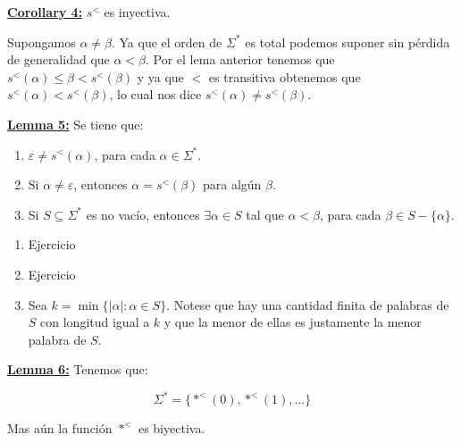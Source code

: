   \QED


  \textbf{\underline{Corollary 4:}} $s^{<}$ es inyectiva.

  \vspace{3mm}
  \PROOF Supongamos $\alpha \neq \beta$. Ya que el orden de $\Sigma^{\ast}$ es total podemos
    suponer sin pérdida de generalidad que $\alpha < \beta$. Por el lema anterior tenemos que $s^{<}(\alpha) \leq \beta
    < s^{<}(\beta)$ y ya que $<$ es transitiva obtenemos que $s^{<}(\alpha)< s^{<}(\beta)$, lo cual nos dice $s^{<}
    (\alpha) \neq s^{<}(\beta)$.

  \QED


  \textbf{\underline{Lemma 5:}} Se tiene que:
    \begin{enumerate}
      \item $\varepsilon \neq s^{<}(\alpha)$, para cada $\alpha \in \Sigma^{\ast}$.
      \item Si $\alpha \neq \varepsilon$, entonces $\alpha = s^{<}(\beta)$ para algún $\beta$.
      \item Si $S\subseteq \Sigma^{\ast}$ es no vacío, entonces $\exists \alpha \in S$ tal que $\alpha < \beta$, para
      cada $\beta \in S-\{\alpha\}$.
    \end{enumerate}

  \PROOF

    \begin{enumerate}
      \item Ejercicio
      \item Ejercicio
      \item Sea $k = \min \{\left\vert \alpha \right\vert: \alpha \in S\}$. Notese que hay una cantidad finita de
      palabras de $S$ con longitud igual a $k$ y que la menor de ellas es justamente la menor palabra de $S$.
    \end{enumerate}

  \QED


  \textbf{\underline{Lemma 6:}} Tenemos que:

    \[
      \Sigma^{\ast} = \{\ast^{<}(0), \ast^{<}(1), ...\}
    \]

    \par Mas aún la función $\ast^{<}$ es biyectiva.

  \vspace{3mm}
  \PROOF

